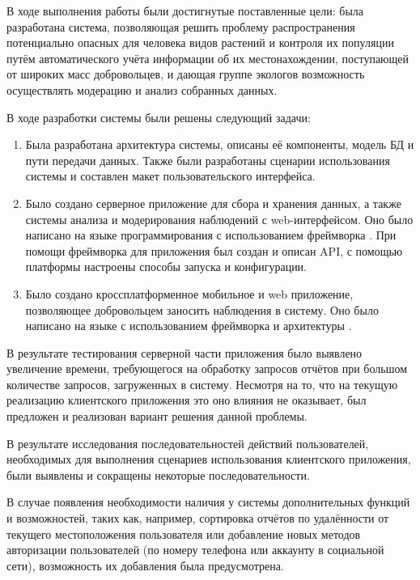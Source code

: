 

\tab 
В ходе выполнения работы были достигнутые поставленные цели: была разработана система, позволяющая решить проблему распространения потенциально опасных для человека видов растений и контроля их популяции путём автоматического учёта информации об их местонахождении, поступающей от широких масс добровольцев, и дающая группе экологов возможность осуществлять модерацию и анализ собранных данных.

\tab
В ходе разработки системы были решены следующий задачи:
\begin{enumerate}
	\item Была разработана архитектура системы, описаны её компоненты, модель БД и пути передачи данных.
	Также были разработаны сценарии использования системы и составлен макет пользовательского интерфейса.
	\item Было создано серверное приложение для сбора и хранения данных, а также системы анализа и модерирования наблюдений с web-интерфейсом.
	Оно было написано на языке программирования  с использованием фреймворка .
	При помощи фреймворка  для приложения был создан и описан API, с помощью платформы  настроены способы запуска и конфигурации.
	\item Было создано кроссплатформенное мобильное и web приложение, позволяющее добровольцем заносить наблюдения в систему.
	Оно было написано на языке  с использованием фреймворка  и архитектуры .
\end{enumerate}

\tab
В результате тестирования серверной части приложения было выявлено увеличение времени, требующегося на обработку запросов отчётов при большом количестве запросов, загруженных в систему.
Несмотря на то, что на текущую реализацию клиентского приложения это оно влияния не оказывает, был предложен и реализован вариант решения данной проблемы.

\tab
В результате исследования последовательностей действий пользователей, необходимых для выполнения сценариев использования клиентского приложения, были выявлены и сокращены некоторые последовательности.

\tab
В случае появления необходимости наличия у системы дополнительных функций и возможностей, таких как, например, сортировка отчётов по удалённости от текущего местоположения пользователя или добавление новых методов авторизации пользователей (по номеру телефона или аккаунту в социальной сети), возможность их добавления была предусмотрена.
